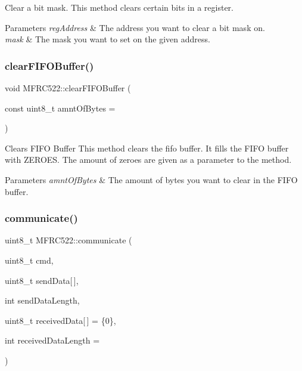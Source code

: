 Clear a bit mask.  This method clears certain bits in a register. 


\begin{DoxyParams}{Parameters}
{\em reg\+Address} & The address you want to clear a bit mask on. \\
\hline
{\em mask} & The mask you want to set on the given address. \\
\hline
\end{DoxyParams}
\mbox{\label{classMFRC522_a0a4fb373d6adcfa08c2f274be1a3c0e5}} 
\subsubsection{\texorpdfstring{clear\+F\+I\+F\+O\+Buffer()}{clearFIFOBuffer()}}
{\footnotesize\ttfamily void M\+F\+R\+C522\+::clear\+F\+I\+F\+O\+Buffer (\begin{DoxyParamCaption}\item[{const uint8\+\_\+t}]{amnt\+Of\+Bytes = {} }\end{DoxyParamCaption})}



Clears F\+I\+FO Buffer  This method clears the fifo buffer. It fills the F\+I\+FO buffer with Z\+E\+R\+O\+ES. The amount of zeroes are given as a parameter to the method. 


\begin{DoxyParams}{Parameters}
{\em amnt\+Of\+Bytes} & The amount of bytes you want to clear in the F\+I\+FO buffer. \\
\hline
\end{DoxyParams}
\mbox{\label{classMFRC522_a993001f188f0f068d59442d1a8934dec}} 
\subsubsection{\texorpdfstring{communicate()}{communicate()}}
{\footnotesize\ttfamily uint8\+\_\+t M\+F\+R\+C522\+::communicate (\begin{DoxyParamCaption}\item[{uint8\+\_\+t}]{cmd,  }\item[{uint8\+\_\+t}]{send\+Data\mbox{[}$\,$\mbox{]},  }\item[{int}]{send\+Data\+Length,  }\item[{uint8\+\_\+t}]{received\+Data\mbox{[}$\,$\mbox{]} = {\ttfamily \{0\}},  }\item[{int}]{received\+Data\+Length = {} }\end{DoxyParamCaption})}



